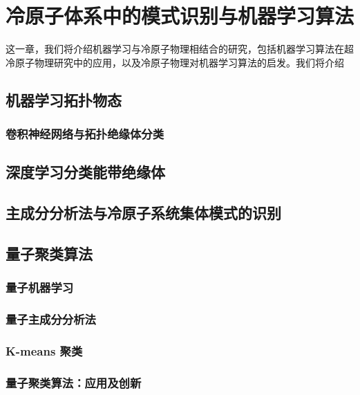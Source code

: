 \chapter{冷原子体系中的模式识别与机器学习算法}

这一章，我们将介绍机器学习与冷原子物理相结合的研究，包括机器学习算法在超冷原子物理研究中的应用，以及冷原子物理对机器学习算法的启发。我们将介绍




\section{机器学习拓扑物态}\label{sec:topoml}

\subsection{卷积神经网络与拓扑绝缘体分类}\label{sec:cnn}


\section{深度学习分类能带绝缘体}\label{sec:dltopo}


\section{主成分分析法与冷原子系统集体模式的识别}\label{sec:pca}


\section{量子聚类算法}\label{sec:quantumcluster}

\subsection{量子机器学习}

\subsection{量子主成分分析法}

\subsection{K-means 聚类}\label{sec:kmeans}

\subsection{量子聚类算法：应用及创新}